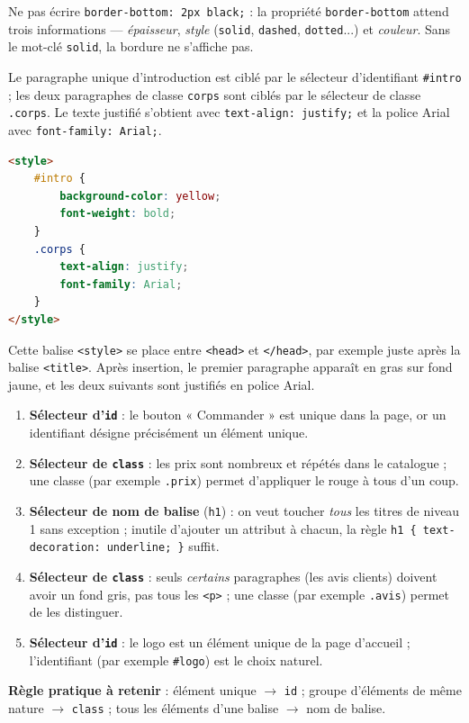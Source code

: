 \documentclass[11pt]{article}
\begin{document}
\begin{attention}
Ne pas écrire \texttt{border-bottom: 2px black;} : la propriété \texttt{border-bottom} attend trois informations — \emph{épaisseur}, \emph{style} (\texttt{solid}, \texttt{dashed}, \texttt{dotted}...) et \emph{couleur}. Sans le mot-clé \texttt{solid}, la bordure ne s'affiche pas.
\end{attention}

\begin{corrige}
Le paragraphe unique d'introduction est ciblé par le sélecteur d'identifiant \texttt{\#intro} ; les deux paragraphes de classe \texttt{corps} sont ciblés par le sélecteur de classe \texttt{.corps}. Le texte justifié s'obtient avec \texttt{text-align: justify;} et la police Arial avec \texttt{font-family: Arial;}.
\begin{lstlisting}[language=HTML]
<style>
    #intro {
        background-color: yellow;
        font-weight: bold;
    }
    .corps {
        text-align: justify;
        font-family: Arial;
    }
</style>
\end{lstlisting}
Cette balise \texttt{<style>} se place entre \texttt{<head>} et \texttt{</head>}, par exemple juste après la balise \texttt{<title>}. Après insertion, le premier paragraphe apparaît en gras sur fond jaune, et les deux suivants sont justifiés en police Arial.
\end{corrige}

\begin{corrige}
\begin{enumerate}
  \item \textbf{Sélecteur d'\texttt{id}} : le bouton « Commander » est unique dans la page, or un identifiant désigne précisément un élément unique.
  \item \textbf{Sélecteur de \texttt{class}} : les prix sont nombreux et répétés dans le catalogue ; une classe (par exemple \texttt{.prix}) permet d'appliquer le rouge à tous d'un coup.
  \item \textbf{Sélecteur de nom de balise} (\texttt{h1}) : on veut toucher \emph{tous} les titres de niveau 1 sans exception ; inutile d'ajouter un attribut à chacun, la règle \texttt{h1 \{ text-decoration: underline; \}} suffit.
  \item \textbf{Sélecteur de \texttt{class}} : seuls \emph{certains} paragraphes (les avis clients) doivent avoir un fond gris, pas tous les \texttt{<p>} ; une classe (par exemple \texttt{.avis}) permet de les distinguer.
  \item \textbf{Sélecteur d'\texttt{id}} : le logo est un élément unique de la page d'accueil ; l'identifiant (par exemple \texttt{\#logo}) est le choix naturel.
\end{enumerate}
\textbf{Règle pratique à retenir} : élément unique $\rightarrow$ \texttt{id} ; groupe d'éléments de même nature $\rightarrow$ \texttt{class} ; tous les éléments d'une balise $\rightarrow$ nom de balise.
\end{corrige}
\end{document}
